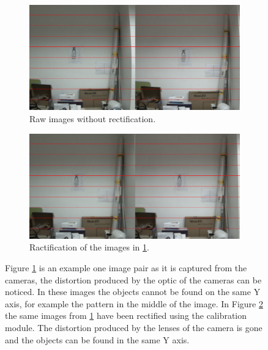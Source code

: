 \documentclass[10pt,a4paper,twocolumn,twoside]{article}
\begin{document}
	\begin{figure}
		\centering
		\begin{subfigure}[t]{0.5\textwidth}
			\centering
			\includegraphics[width=\linewidth]{img/regular.png}
			\caption{Raw images without rectification.}
			\label{fig:rec:regular}
		\end{subfigure}%
	\vspace{1cm}
		\begin{subfigure}[t]{0.5\textwidth}
			\centering
			\includegraphics[width=\linewidth]{img/rectified.png}
			\caption{Ractification of the images in \ref{fig:rec:regular}.}
			\label{fig:rec:ractified}
		\end{subfigure}
		\caption{Figure \ref{fig:rec:regular} is an example one image pair as it is captured from the cameras, the distortion produced by the optic of the cameras can be noticed. In these images the objects cannot be found on the same Y axis, for example the pattern in the middle of the image. In Figure \ref{fig:rec:ractified} the same images from \ref{fig:rec:regular} have been rectified using the calibration module. The distortion produced by the lenses of the camera is gone and the objects can be found in the same Y axis. }
		\label{fig:rec}
	\end{figure}
	
\end{document}
